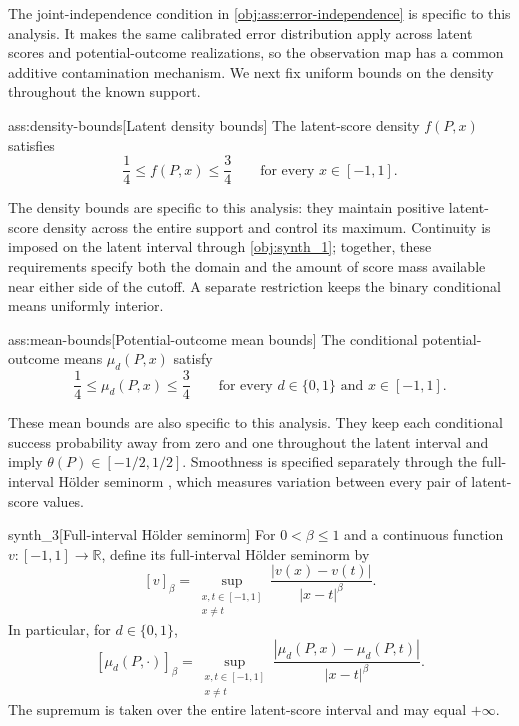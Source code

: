 \documentclass[11pt]{article}
\begin{document}
The joint-independence condition in \cref{obj:ass:error-independence} is specific to this analysis. It makes the same calibrated error distribution apply across latent scores and potential-outcome realizations, so the observation map has a common additive contamination mechanism. We next fix uniform bounds on the density throughout the known support.

\begin{assumptionv}{ass:density-bounds}[Latent density bounds]
The latent-score density \(f(P,x)\) satisfies
\[
\frac14\le f(P,x)\le\frac34
\qquad\text{for every }x\in[-1,1].
\]
\end{assumptionv}

The density bounds are specific to this analysis: they maintain positive latent-score density across the entire support and control its maximum. Continuity is imposed on the latent interval through \cref{obj:synth_1}; together, these requirements specify both the domain and the amount of score mass available near either side of the cutoff. A separate restriction keeps the binary conditional means uniformly interior.

\begin{assumptionv}{ass:mean-bounds}[Potential-outcome mean bounds]
The conditional potential-outcome means \(\mu_d(P,x)\) satisfy
\[
\frac14\le\mu_d(P,x)\le\frac34
\qquad\text{for every }d\in\{0,1\}\text{ and }x\in[-1,1].
\]
\end{assumptionv}

These mean bounds are also specific to this analysis. They keep each conditional success probability away from zero and one throughout the latent interval and imply \(\theta(P)\in[-1/2,1/2]\). Smoothness is specified separately through the full-interval Hölder seminorm , which measures variation between every pair of latent-score values.

\begin{definitionv}{synth_3}[Full-interval Hölder seminorm]
For \(0<\beta\le1\) and a continuous function \(v:[-1,1]\to\mathbb R\), define its full-interval Hölder seminorm by
\[
[v]_\beta
=
\sup_{\substack{x,t\in[-1,1]\\x\ne t}}
\frac{|v(x)-v(t)|}{|x-t|^\beta}.
\]
In particular, for \(d\in\{0,1\}\),
\[
[\mu_d(P,\cdot)]_\beta
=
\sup_{\substack{x,t\in[-1,1]\\x\ne t}}
\frac{|\mu_d(P,x)-\mu_d(P,t)|}{|x-t|^\beta}.
\]
The supremum is taken over the entire latent-score interval and may equal \(+\infty\).
\end{definitionv}
\end{document}
